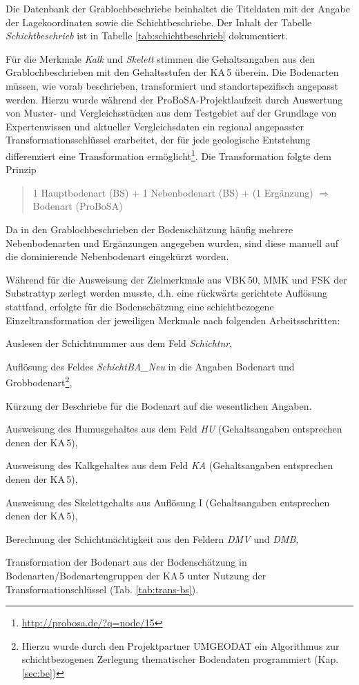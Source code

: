 Die Datenbank der Grablochbeschriebe beinhaltet die Titeldaten mit der Angabe der Lagekoordinaten sowie die Schichtbeschriebe. Der Inhalt der Tabelle \textit{Schichtbeschrieb} ist in Tabelle \ref{tab:schichtbeschrieb} dokumentiert.\

Für die Merkmale \textit{Kalk} und \textit{Skelett} stimmen die Gehaltsangaben aus den Grablochbeschrieben mit den Gehaltsstufen der KA\,5 überein. Die Bodenarten müssen, wie vorab beschrieben, transformiert und standortspezifisch angepasst werden.  Hierzu wurde während der ProBoSA-Projektlaufzeit durch Auswertung von Muster- und Vergleichsstücken aus dem Testgebiet auf der Grundlage von Expertenwissen und aktueller Vergleichsdaten ein regional angepasster Transformationsschlüssel erarbeitet, der für jede geologische Entstehung differenziert eine Transformation ermöglicht\footnote{\url{http://probosa.de/?q=node/15}}. Die Transformation folgte dem Prinzip

\begin{quote}
 1 Hauptbodenart (BS) +   1 Nebenbodenart (BS)  + (1 Ergänzung) $\Rightarrow$  Bodenart (ProBoSA) 
\end{quote}

Da in den Grablochbeschrieben der Bodenschätzung häufig mehrere Nebenbodenarten und Ergänzungen angegeben wurden, sind diese manuell auf die dominierende Nebenbodenart eingekürzt worden.\

Während für die Ausweisung der Zielmerkmale aus VBK\,50, MMK und FSK der Substrattyp zerlegt werden musste, d.h. eine rückwärts gerichtete Auflösung stattfand, erfolgte für die Bodenschätzung eine schichtbezogene Einzeltransformation der jeweiligen Merkmale nach folgenden Arbeitsschritten:

\begin{compactenum}
\item Auslesen der Schichtnummer aus dem Feld \textit{Schichtnr},
\item Auflösung des Feldes \textit{SchichtBA\_Neu} in die Angaben Bodenart und Grobbodenart\footnote{Hierzu wurde  durch den Projektpartner UMGEODAT  ein Algorithmus zur schichtbezogenen Zerlegung thematischer Bodendaten  programmiert (Kap. \ref{sec:be})},
\item Kürzung der Beschriebe für die Bodenart auf die wesentlichen Angaben.
\item Ausweisung des Humusgehaltes aus dem Feld \textit{HU} (Gehaltsangaben entsprechen denen der KA\,5),
\item Ausweisung des Kalkgehaltes aus dem Feld \textit{KA} (Gehaltsangaben entsprechen denen der KA\,5),
\item Ausweisung des Skelettgehalts aus Auflösung I (Gehaltsangaben entsprechen denen der KA\,5),
\item Berechnung der Schichtmächtigkeit aus den Feldern \textit{DMV} und \textit{DMB},
\item Transformation der Bodenart aus der Bodenschätzung in Bodenarten/Bodenartengruppen der KA\,5 unter Nutzung der Transformationschlüssel (Tab. \ref{tab:trans-bs}).
\end{compactenum}

